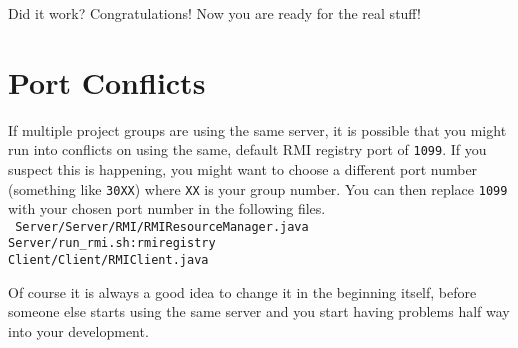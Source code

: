 \documentclass[11pt]{article}
\begin{document}
Did it work? Congratulations! Now you are ready for the real stuff!


\section*{Port Conflicts}
If multiple project groups are using the same server, it is possible that you might run into conflicts on using the same, default RMI registry port of \texttt{1099}. If you suspect this is happening, you might want to choose a different port number (something like \texttt{30XX}) where \texttt{XX} is your group number. You can then replace \texttt{1099} with your chosen port number in the following files.\\
\texttt{
Server/Server/RMI/RMIResourceManager.java \\
Server/run\_rmi.sh:rmiregistry \\
Client/Client/RMIClient.java \\
}

Of course it is always a good idea to change it in the beginning itself, before someone else starts using the same server and you start having problems half way into your development.
\end{document}

